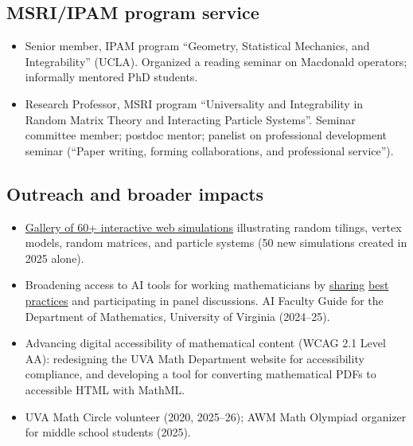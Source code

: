 \documentclass[letterpaper,11pt]{article}
\begin{document}
\subsection*{MSRI/IPAM program service}

\begin{itemize}
	\item [Spring 2024:]
	Senior member, IPAM program ``Geometry, Statistical Mechanics, and Integrability'' (UCLA).
	Organized a reading seminar on Macdonald operators; informally mentored PhD students.
	\item [Fall 2021:]
	Research Professor, MSRI program ``Universality and Integrability in Random Matrix Theory and Interacting Particle Systems''.
	Seminar committee member; postdoc mentor; panelist on professional development seminar (``Paper writing, forming collaborations, and professional service'').
\end{itemize}

\subsection*{Outreach and broader impacts}

\begin{itemize}
  \item
  \href{https://lpetrov.cc/simulations/}{Gallery of 60+ interactive web simulations}
  illustrating random tilings, vertex models, random matrices, and particle systems
  (50 new simulations created in 2025 alone).
  \item
  Broadening access to AI tools for working mathematicians by \href{https://lpetrov.cc/AI-math/}{sharing} \href{https://storage.lpetrov.cc/research_files/talks/AI_UVA_Oct10.pdf}{best practices} and participating in panel discussions. AI Faculty Guide for the Department of Mathematics, University of Virginia (2024--25).
  \item
  Advancing digital accessibility of mathematical content (WCAG 2.1 Level AA):
  redesigning the UVA Math Department website for accessibility compliance,
  and developing a tool for converting mathematical PDFs to accessible HTML with MathML.
  \item
  UVA Math Circle volunteer (2020, 2025--26);
  AWM Math Olympiad organizer for middle school students (2025).
\end{itemize}



\end{document}
